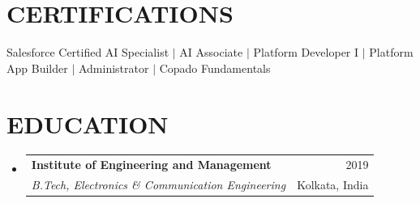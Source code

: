 \documentclass[letterpaper,11pt]{article}
\makeatletter
\newcommand{\resumeSubheading}[4]{
  \vspace{-1pt}\item
    \begin{tabular*}{\textwidth}[t]{l@{\extracolsep{\fill}}r}
      \textbf{#1} & {\color{dark-grey}\small #2}\vspace{1pt}\\
      \textit{#3} & {\color{dark-grey} \small #4}\\
    \end{tabular*}\vspace{-4pt}
}
\newcommand{\resumeSubHeadingListStart}{\begin{itemize}[leftmargin=0in, label={}]}
\newcommand{\resumeSubHeadingListEnd}{\end{itemize}}
\makeatother
\begin{document}
\section{CERTIFICATIONS}
 \begin{itemize}[leftmargin=0in, label={}]
    \small{\item{
     Salesforce Certified AI Specialist $|$ AI Associate $|$ Platform Developer I $|$ Platform App Builder $|$ Administrator $|$ Copado Fundamentals
    }}
 \end{itemize}

\section{EDUCATION}
  \resumeSubHeadingListStart
    \resumeSubheading
      {Institute of Engineering and Management}{2019}
      {B.Tech, Electronics \& Communication Engineering}{Kolkata, India}
  \resumeSubHeadingListEnd
\end{document}
